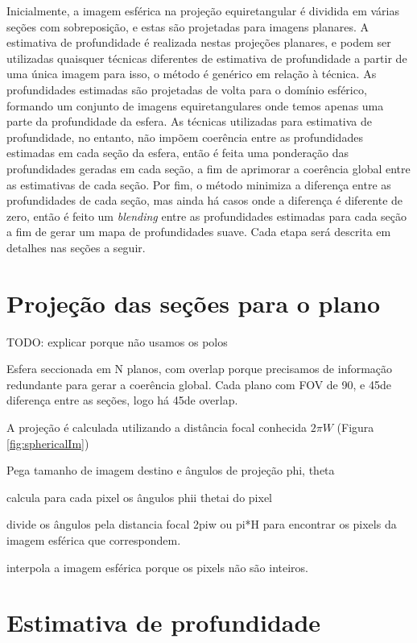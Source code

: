 \documentclass[cic,tc]{iiufrgs}
\begin{document}
Inicialmente, a imagem esférica na projeção equiretangular é dividida em várias seções com sobreposição, e estas são projetadas para imagens planares. A estimativa de profundidade é realizada nestas projeções planares, e podem ser utilizadas quaisquer técnicas diferentes de estimativa de profundidade a partir de uma única imagem para isso, o método é genérico em relação à técnica. As profundidades estimadas são projetadas de volta para o domínio esférico, formando um conjunto de imagens equiretangulares onde temos apenas uma parte da profundidade da esfera. As técnicas utilizadas para estimativa de profundidade, no entanto, não impõem coerência entre as profundidades estimadas em cada seção da esfera, então é feita uma ponderação das profundidades geradas em cada seção, a fim de aprimorar a coerência global entre as estimativas de cada seção. Por fim, o método minimiza a diferença entre as profundidades de cada seção, mas ainda há casos onde a diferença é diferente de zero, então é feito um \textit{blending} entre as profundidades estimadas para cada seção a fim de gerar um mapa de profundidades suave. Cada etapa será descrita em detalhes nas seções a seguir.

\section{Projeção das seções para o plano}

TODO: explicar porque não usamos os polos

Esfera seccionada em N planos, com overlap porque precisamos de informação redundante para gerar a coerência global. Cada plano com FOV de 90\degree, e 45\degree de diferença entre as seções, logo há 45\degree de overlap.

A projeção é calculada utilizando a distância focal conhecida $2\pi W$ (Figura \ref{fig:sphericalIm})

Pega tamanho de imagem destino e ângulos de projeção phi, theta

calcula para cada pixel os ângulos phii thetai do pixel

divide os ângulos pela distancia focal 2piw ou pi*H para encontrar os pixels da imagem esférica que correspondem.

interpola a imagem esférica porque os pixels não são inteiros.



\section{Estimativa de profundidade}
\end{document}
